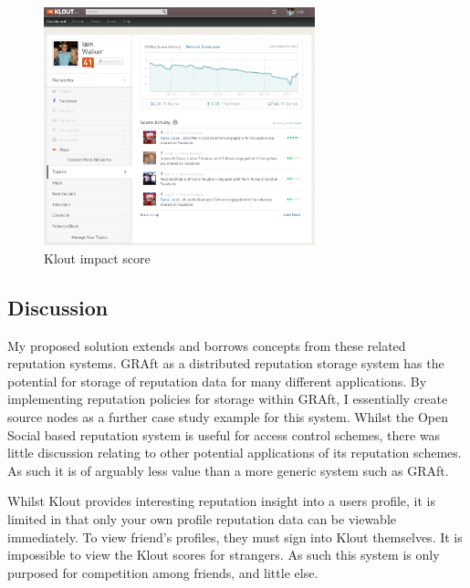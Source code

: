 \begin{figure}[h!]
\centering
\includegraphics[width=0.7\textwidth]{Images/klout.png}
\caption{Klout impact score}
\end{figure}

\subsection{Discussion}

My proposed solution extends and borrows concepts from these related reputation systems. GRAft as a distributed reputation storage system has the potential for storage of reputation data for many different applications. By implementing reputation policies for storage within GRAft, I essentially create source nodes as a further case study example for this system. Whilst the Open Social based reputation system is useful for access control schemes, there was little discussion relating to other potential applications of its reputation schemes. As such it is of arguably less value than a more generic system such as GRAft. 

Whilst Klout provides interesting reputation insight into a users profile, it is limited in that only your own profile reputation data can be viewable immediately. To view friend's profiles, they must sign into Klout themselves. It is impossible to view the Klout scores for strangers. As such this system is only purposed for competition among friends, and little else. 





